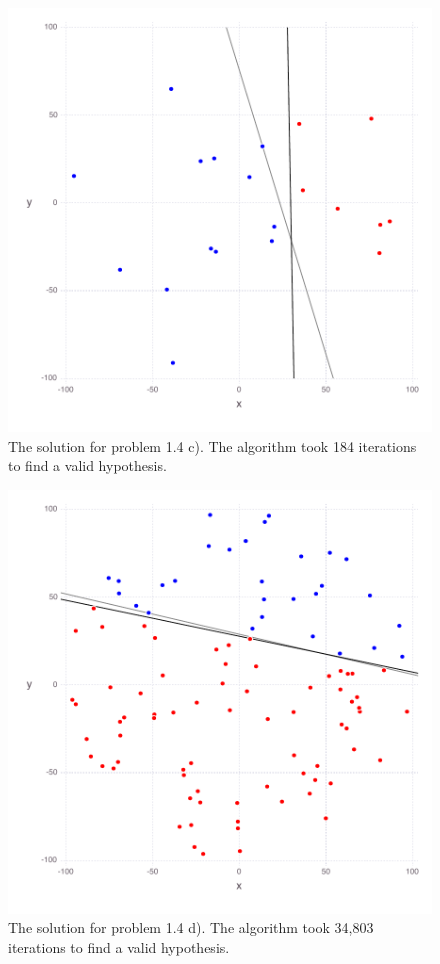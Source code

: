 \documentclass[11pt,letterpaper]{article}
\begin{document}
\begin{figure}
	\centering
    \includegraphics[width=\textwidth]{problem_1_4c.pdf}
	\caption{The solution for problem 1.4 c).  The algorithm took 184 iterations to find a valid hypothesis.}
\end{figure}


\begin{figure}
	\centering
    \includegraphics[width=\textwidth]{problem_1_4d.pdf}
	\caption{The solution for problem 1.4 d).  The algorithm took 34,803 iterations to find a valid hypothesis.}
\end{figure}
\end{document}
